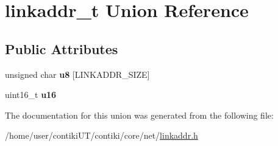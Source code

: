 \hypertarget{unionlinkaddr__t}{}\section{linkaddr\+\_\+t Union Reference}
\label{unionlinkaddr__t}
\subsection*{Public Attributes}
\begin{DoxyCompactItemize}
\item 
\hypertarget{unionlinkaddr__t_a62911e7c8652ae087d40f051d0a21602}{}unsigned char {\bfseries u8} \mbox{[}L\+I\+N\+K\+A\+D\+D\+R\+\_\+\+S\+I\+Z\+E\mbox{]}\label{unionlinkaddr__t_a62911e7c8652ae087d40f051d0a21602}

\item 
\hypertarget{unionlinkaddr__t_ad02de3a9cd3c5b07c1d9a45cd16d1b78}{}uint16\+\_\+t {\bfseries u16}\label{unionlinkaddr__t_ad02de3a9cd3c5b07c1d9a45cd16d1b78}

\end{DoxyCompactItemize}


The documentation for this union was generated from the following file\+:\begin{DoxyCompactItemize}
\item 
/home/user/contiki\+U\+T/contiki/core/net/\hyperlink{linkaddr_8h}{linkaddr.\+h}\end{DoxyCompactItemize}
